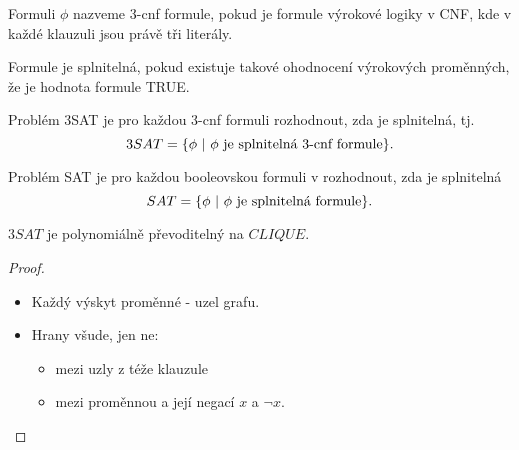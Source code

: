 
    
    \begin{frame}%
    \begin{definition}
    Formuli $\phi$ nazveme \alert{3-cnf formule}, pokud je formule výrokové logiky v CNF, kde v každé klauzuli jsou právě tři literály.
    
    Formule \alert{je splnitelná}, pokud existuje takové ohodnocení výrokových proměnných, že je hodnota formule TRUE.
    
    Problém \alert{3SAT} je pro každou 3-cnf formuli rozhodnout, zda je splnitelná, tj.
    $$3SAT=\{\phi \ |\  \phi \hbox{ je splnitelná 3-cnf formule}\}\hbox{.}
    $$
    
    Problém \alert{SAT} je pro každou booleovskou formuli v rozhodnout, zda je splnitelná
    $$SAT=\{\phi \ |\  \phi \hbox{ je splnitelná formule}\}\hbox{.}
    $$
    \end{definition}
    \vspace{-3mm}
    \pause
    \begin{theorem}
        $3SAT$ je polynomiálně převoditelný na $CLIQUE$.
    \end{theorem}
    \vspace{-3mm}
    \pause
    \begin{proof}
        \begin{itemize}
            \item Každý výskyt proměnné - uzel grafu.
            \item Hrany všude, jen ne:
            \begin{itemize}
                \item mezi uzly z téže klauzule
                \item mezi proměnnou a její negací $x$ a $\neg {x}$.
            \end{itemize}
        \end{itemize}
    \end{proof}
    \end{frame}
    
